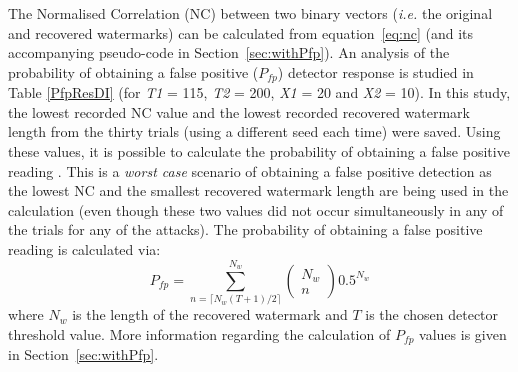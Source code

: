 \documentclass[12pt]{report}
\begin{document}
The Normalised Correlation (NC) between two binary vectors (\emph{i.e.} the original and recovered watermarks)
can be calculated from equation~\ref{eq:nc} (and its accompanying pseudo-code in Section~\ref{sec:withPfp}). 
An analysis of the probability of obtaining a false positive ($P_{fp}$)
detector response is studied in 
Table \ref{PfpResDI} (for \emph{T1} = 115, \emph{T2} = 200, \emph{X1} = 20 and \emph{X2} = 10). 
In this study, the
lowest recorded NC value
and the lowest recorded recovered watermark length
from the thirty trials (using a different seed each time) were saved.
Using these values, it is possible to calculate the probability of obtaining a false 
positive reading \cite{kundurPfpDI}. This is a \emph{worst case} scenario of obtaining a false positive
detection as the lowest NC and the smallest recovered watermark length are being used in the calculation
(even though these two values did not occur simultaneously in any of the trials for any of the attacks).
The probability of obtaining a false positive reading is calculated via: 
\begin{equation}
\label{eq:PfpBKX_di}
        P_{fp} = \sum^{N_{w}}_{n= \lceil N_{w}(T+1)/2 \rceil} \left(
                                                                        \begin{array}{c}
                                                                                N_{w} \\
                                                                                n
                                                                        \end{array}
                                                              \right)                           0.5^{N_{w}}
\end{equation}
where $N_{w}$ is the length of the recovered watermark and $T$ is the chosen detector threshold value.
More information regarding the calculation of $P_{fp}$ values is given in Section~\ref{sec:withPfp}.
\end{document}

